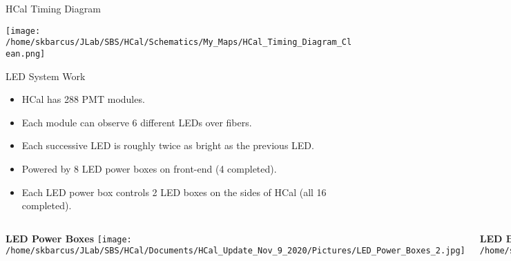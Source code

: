 \documentclass[10pt]{beamer}
\begin{document}
\begin{frame}{HCal Timing Diagram}

	\begin{center}
	    \texttt{[image: /home/skbarcus/JLab/SBS/HCal/Schematics/My\_Maps/HCal\_Timing\_Diagram\_Clean.png]}
  	\end{center}

\end{frame}

\begin{frame}{LED System Work}

    \begin{itemize}
		\item HCal has 288 PMT modules. 
		\item Each module can observe 6 different LEDs over fibers.
		\item Each successive LED is roughly twice as bright as the previous LED.
        \item Powered by 8 LED power boxes on front-end (4 completed).
        \item Each LED power box controls 2 LED boxes on the sides of HCal (all 16 completed).
    \end{itemize}
    
    \begin{columns}[T,onlytextwidth]
	
	\vspace{-3mm}
	\begin{center}
	    \textbf{LED Power Boxes}
	    \texttt{[image: /home/skbarcus/JLab/SBS/HCal/Documents/HCal\_Update\_Nov\_9\_2020/Pictures/LED\_Power\_Boxes\_2.jpg]}
  	\end{center}
	
	
	\vspace{-3mm}
	\begin{center}
		\textbf{LED Boxes}
		\texttt{[image: /home/skbarcus/JLab/SBS/HCal/Documents/HCal\_Update\_Nov\_9\_2020/Pictures/LED\_Boxes.jpg]}
  	\end{center}
	
	\end{columns}

\end{frame}
\end{document}
